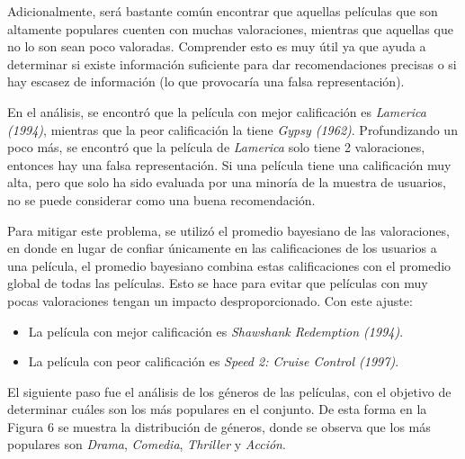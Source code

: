 \documentclass[letterpaper,10pt,final,hyphenatedtitles]{papertexKS}
\begin{document}
\begin{news}{2}
	\begin{center}
	\end{center}

	Adicionalmente, será bastante común encontrar que aquellas películas que son altamente populares cuenten con muchas valoraciones, mientras que aquellas que no lo son sean poco valoradas. Comprender esto es muy útil ya que ayuda a determinar si existe información suficiente para dar recomendaciones precisas o si hay escasez de información (lo que provocaría una falsa representación).

	En el análisis, se encontró que la película con mejor calificación es \textit{Lamerica (1994)}, mientras que la peor calificación la tiene \textit{Gypsy (1962)}. Profundizando un poco más, se encontró que la película de \textit{Lamerica} solo tiene 2 valoraciones, entonces hay una falsa representación. Si una película tiene una calificación muy alta, pero que solo ha sido evaluada por una minoría de la muestra de usuarios, no se puede considerar como una buena recomendación.

	Para mitigar este problema, se utilizó el promedio bayesiano de las valoraciones, en donde en lugar de confiar únicamente en las calificaciones de los usuarios a una película, el promedio bayesiano combina estas calificaciones con el promedio global de todas las películas. Esto se hace para evitar que películas con muy pocas valoraciones tengan un impacto desproporcionado. Con este ajuste:

	\begin{itemize}
		\item La película con mejor calificación es \textit{Shawshank Redemption (1994)}.
		\item La película con peor calificación es \textit{Speed 2: Cruise Control (1997)}.
	\end{itemize}

	El siguiente paso fue el análisis de los géneros de las películas, con el objetivo de determinar cuáles son los más populares en el conjunto. De esta forma en la Figura 6 se muestra la distribución de géneros, donde se observa que los más populares son \textit{Drama}, \textit{Comedia}, \textit{Thriller} y \textit{Acción}.

	\begin{center}
	\end{center}


\end{news}
\end{document}
